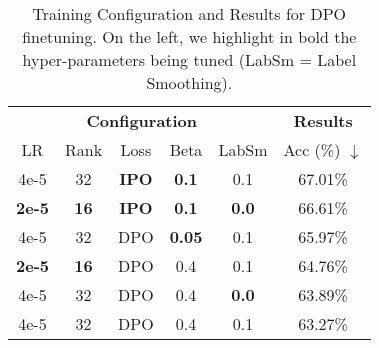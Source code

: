 \begin{table}[ht]
    \small
    \centering
    \caption{Training Configuration and Results for DPO finetuning. On the left, we highlight in bold the hyper-parameters being tuned (LabSm = Label Smoothing).}
    \begin{tabular}{ccccc|c}
        \toprule
        \multicolumn{5}{c}{\textbf{Configuration}} & \textbf{Results} \\
         LR & Rank & Loss & Beta & LabSm & Acc (\%) $\downarrow$\\
        \midrule
        4e-5 & 32 & \textbf{IPO} & \textbf{0.1} & 0.1 & 67.01\% \\
        \textbf{2e-5} & \textbf{16} & \textbf{IPO} & \textbf{0.1} & \textbf{0.0} & 66.61\% \\
        4e-5 & 32 & DPO & \textbf{0.05} & 0.1 & 65.97\% \\
        \textbf{2e-5} & \textbf{16} & DPO & 0.4 & 0.1 & 64.76\% \\
        4e-5 & 32 & DPO & 0.4 & \textbf{0.0} & 63.89\% \\
        4e-5 & 32 & DPO & 0.4 & 0.1 & 63.27\% \\
        \bottomrule
    \end{tabular}
    \label{tab:dpo-results}
\end{table}